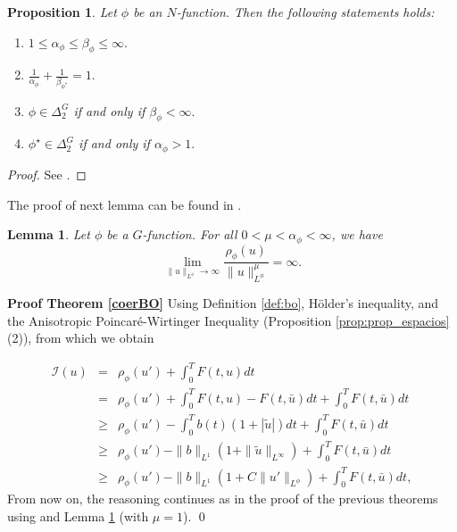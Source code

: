 \documentclass[twoside]{article}
\theoremstyle{definition}
\theoremstyle{plain}
\newtheorem{lem}[definition]{Lemma}
\newtheorem{Propos}[definition]{Proposition}
\theoremstyle{remark}
\begin{document}
\begin{Propos}\label{prop:prop_mat}
Let $\phi$ be an $N$-function. Then the following statements holds:
\begin{enumerate}\label{propiedadesindices}
\item $1\leq \alpha_{\phi}\leq \beta_{\phi}\leq \infty.$
\item $\frac{1}{\alpha_{\phi}}+\frac{1}{\beta_{\phi^\star}}=1.$
\item $\phi \in \Delta_2^G$ if and only if $\beta_{\phi}<\infty.$
\item $\phi^\star \in \Delta_2^G$ if and only if $\alpha_{\phi}>1.$
\end{enumerate}

\end{Propos}
\begin{proof} See \cite{m}.\end{proof}


The proof of next lemma can be  found in \cite[Lemma 5.2]{acinas2015some-2}.

\begin{lem}\label{lema5.2}
Let $\phi$ be a $G$-function. For all $0<\mu<\alpha_\phi<\infty$, we have
\[\lim_{\|u\|_{L^\phi}\to \infty}\frac{\rho_\phi(u)}{\|u\|_{L^\phi}^\mu}=\infty.\]
\end{lem}

\noindent\textbf{Proof Theorem \ref{coerBO}  }
Using Definition \ref{def:bo},  Hölder's inequality, and the Anisotropic  Poincaré-Wirtinger
Inequality (Proposition \ref{prop:prop_espacios}(2)), from which we obtain

\begin{eqnarray*}
\mathcal{I}(u) &=& \rho_\phi(u') + \int_0^T F(t,u)dt \\
&=& \rho_\phi(u') + \int_0^T F(t,u) - F(t,\bar{u})dt + \int_0^T F(t,\bar{u})dt \\
&\geq& \rho_\phi(u') - \int_0^T b(t)(1 + |\tilde{u}|)dt + \int_0^T F(t,\bar{u})dt \\
&\geq& \rho_\phi(u') - \|b\|_{L^1}(1 + \|\tilde{u}\|_{L^\infty}) + \int_0^T F(t,\bar{u})dt \\
&\geq& \rho_\phi(u') - \|b\|_{L^1}(1 + C\|u'\|_{L^\phi}) + \int_0^T F(t,\bar{u})dt,
\end{eqnarray*}
From now on, the reasoning continues as in the proof of the previous theorems using  and Lemma \ref{lema5.2} (with $\mu=1$).  \qed
\end{document}
